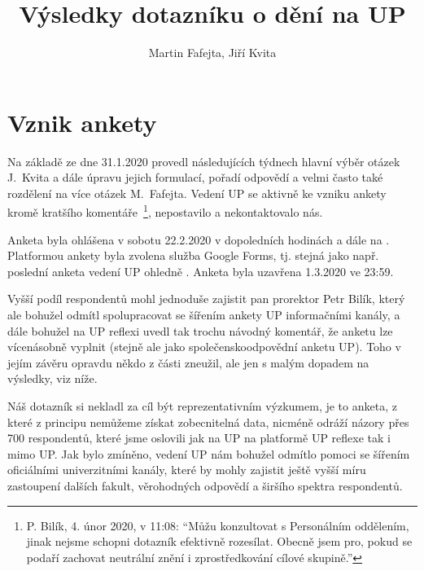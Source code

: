 \documentclass[a4paper,twoside]{article}
\author{Martin Fafejta, Jiří Kvita}
\title{Výsledky dotazníku o dění na UP}
\begin{document}
\maketitle

\tableofcontents
\newpage

\section{Vznik ankety}

Na základě  ze dne 31.1.2020 provedl následujících týdnech hlavní výběr otázek J.~Kvita a dále úpravu jejich formulací, pořadí odpovědí a velmi často také rozdělení na více otázek M.~Fafejta. Vedení UP se aktivně ke vzniku ankety kromě kratšího komentáře~\footnote{P. Bilík, 4. únor 2020, v 11:08: ``Můžu konzultovat s Personálním oddělením, jinak nejsme schopni dotazník efektivně rozesílat. Obecně jsem pro, pokud se podaří zachovat neutrální znění i zprostředkování cílové skupině.''}, nepostavilo a nekontaktovalo nás.

Anketa byla ohlášena v sobotu 22.2.2020  v dopoledních hodinách  a dále na . Platformou ankety byla zvolena služba Google Forms, tj. stejná jako např. poslední anketa vedení UP ohledně . Anketa byla uzavřena 1.3.2020 ve 23:59.

Vyšší podíl respondentů mohl jednoduše zajistit pan prorektor Petr Bilík, který ale bohužel odmítl spolupracovat se šířením ankety UP informačními kanály, a dále bohužel na UP reflexi uvedl tak trochu návodný komentář, že anketu lze vícenásobně vyplnit (stejně ale jako společenskoodpovědní anketu UP). Toho v jejím závěru opravdu někdo z části zneužil, ale jen s malým dopadem na výsledky, viz níže.

Náš dotazník si nekladl za cíl být reprezentativním výzkumem, je to anketa, z které z principu nemůžeme získat zobecnitelná data, nicméně odráží názory přes 700 respondentů, které jsme oslovili jak na UP na platformě UP reflexe tak i mimo UP. Jak bylo zmíněno, vedení UP nám bohužel odmítlo pomoci se šířením oficiálními univerzitními kanály, které by mohly zajistit ještě vyšší míru zastoupení dalších fakult, věrohodných odpovědí a širšího spektra respondentů.
\end{document}
